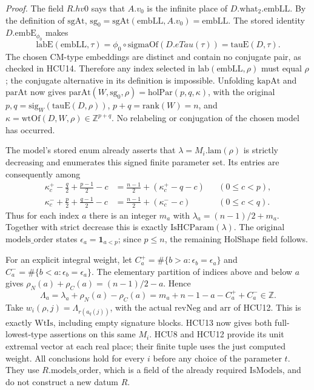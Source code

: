 \emph{Proof.}
The field \(R.hv0\) says that \(A.v_0\) is the infinite place of
\(D.\mathrm{what}_2.\mathrm{embLL}\).
By the definition of \(\mathrm{sgAt}\),
\(\mathrm{sg}_0=\mathrm{sgAt}(\mathrm{embLL},A.v_0)=\mathrm{embLL}\).
The stored identity \(D.\mathrm{embE}_{\phi_0}\) makes
\[
 \mathrm{labE}(\mathrm{embLL},\tau)
   =\phi_0\circ\mathrm{sigmaOf}(D.eTau(\tau))
   =\mathrm{tauE}(D,\tau).
 \tag{HCU.55}
\]
The chosen CM-type embeddings are distinct and contain no conjugate
pair, as checked in HCU14.  Therefore any index selected in
\(\mathrm{lab}(\mathrm{embLL},\rho)\) must equal \(\rho\);
the conjugate alternative in its definition is impossible.
Unfolding \(\mathrm{kapAt}\) and \(\mathrm{parAt}\) now gives
\(\mathrm{parAt}(W,\mathrm{sg}_0,\rho)
=\mathrm{holPar}(p,q,\kappa)\), with the original
\(p,q=\mathrm{sig}_W(\mathrm{tauE}(D,\rho))\),
\(p+q=\mathrm{rank}(W)=n\), and
\(\kappa=\mathrm{wtOf}(D,W,\rho)\in\mathbb Z^{p+q}\).
No relabeling or conjugation of the chosen model has occurred.

The model's stored \(\mathrm{enum}\) already asserts that
\(\lambda=M_i.\mathrm{lam}(\rho)\) is strictly decreasing and
enumerates this signed finite parameter set.
Its entries are consequently among
\[
 \begin{aligned}
  \kappa_c^+-\frac q2+\frac{p-1}{2}-c
      &=\frac{n-1}{2}+(\kappa_c^+-q-c)
        &&(0\le c<p),\\
  \kappa_c^-+\frac p2+\frac{q-1}{2}-c
      &=\frac{n-1}{2}+(\kappa_c^--c)
        &&(0\le c<q).
 \end{aligned}
 \tag{HCU.56}
\]
Thus for each index \(a\) there is an integer \(m_a\) with
\(\lambda_a=(n-1)/2+m_a\).  Together with strict decrease this is
exactly \(\mathrm{IsHCParam}(\lambda)\).
The original \(\mathrm{models\_order}\) states
\(\epsilon_a=\mathbf 1_{a<p}\); since \(p\le n\), the remaining
\(\mathrm{HolShape}\) field follows.

For an explicit integral weight, let
\(C_a^+=\#\{b>a:\epsilon_b=\epsilon_a\}\) and
\(C_a^-=\#\{b<a:\epsilon_b=\epsilon_a\}\).
The elementary partition of indices above and below \(a\) gives
\(\rho_N(a)+\rho_C(a)=(n-1)/2-a\).  Hence
\[
 \Lambda_a=\lambda_a+\rho_N(a)-\rho_C(a)
       =m_a+n-1-a-C_a^++C_a^-\in\mathbb Z .
 \tag{HCU.57}
\]
Take \(w_i(\rho,j)=\Lambda_{r(a_q(j))}\), with the actual
\(\mathrm{revNeg}\) and \(\mathrm{arr}\) of HCU12.
This is exactly \(\mathrm{WtIs}\), including empty signature blocks.
HCU13 now gives both full-lowest-type assertions on this same \(M_i\).
HCU8 and HCU12 provide its unit extremal vector at each real place;
their finite tuple uses the just computed weight.
All conclusions hold for every \(i\) before any choice of the
parameter \(t\).  They use \(R.\mathrm{models\_order}\), which is a
field of the already required \(\mathrm{IsModels}\), and do not
construct a new datum \(R\).

